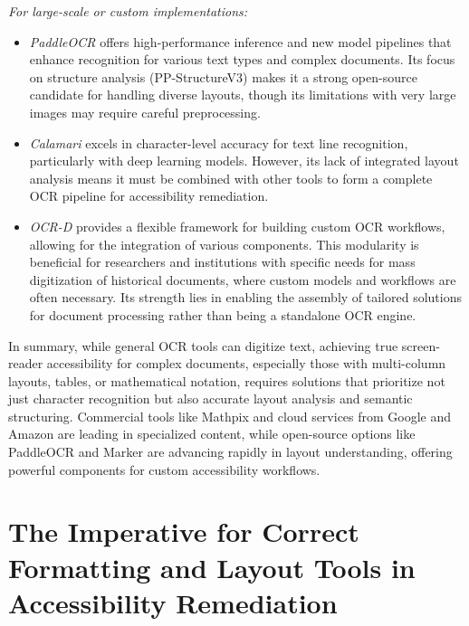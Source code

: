 \emph{For large-scale or custom implementations:}
\begin{itemize}
    \item \emph{PaddleOCR} offers high-performance inference and new model pipelines that enhance recognition for various text types and complex documents. \cite{PaddleOCR} Its focus on structure analysis (PP-StructureV3) makes it a strong open-source candidate for handling diverse layouts, though its limitations with very large images may require careful preprocessing. \cite{GithubPaddleOCR}
    \item \emph{Calamari} excels in character-level accuracy for text line recognition, particularly with deep learning models. \cite{CalamariRG, JLCLCalamari} However, its lack of integrated layout analysis means it must be combined with other tools to form a complete OCR pipeline for accessibility remediation. \cite{ArxivCalamari, SourceOpenNewsOCR}
    \item \emph{OCR-D} provides a flexible framework for building custom OCR workflows, allowing for the integration of various components. \cite{OCRD} This modularity is beneficial for researchers and institutions with specific needs for mass digitization of historical documents, where custom models and workflows are often necessary. Its strength lies in enabling the assembly of tailored solutions for document processing rather than being a standalone OCR engine.
\end{itemize}

In summary, while general OCR tools can digitize text, achieving true screen-reader accessibility for complex documents, especially those with multi-column layouts, tables, or mathematical notation, requires solutions that prioritize not just character recognition but also accurate layout analysis and semantic structuring. Commercial tools like Mathpix and cloud services from Google and Amazon are leading in specialized content, while open-source options like PaddleOCR and Marker are advancing rapidly in layout understanding, offering powerful components for custom accessibility workflows.

\section{The Imperative for Correct Formatting and Layout Tools in Accessibility Remediation}
\label{sec:ocr-formatting-remediation}

\vspace{1em}

